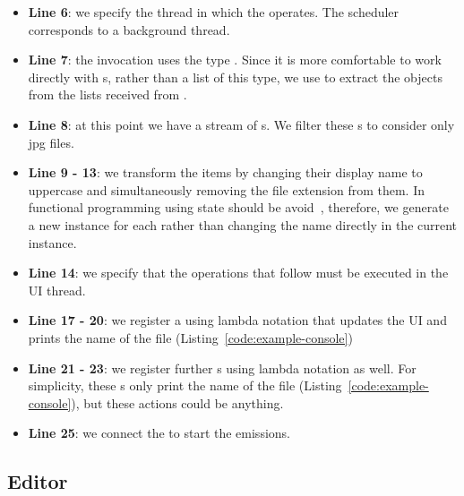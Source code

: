 \documentclass[type=bsc,accentcolor=tud9c]{tudthesis}
\begin{document}
\begin{itemize}
	\item {\bf Line 6}: we specify the thread in which the  operates. The scheduler  corresponds to a background thread.
	\item {\bf Line 7}: the  invocation uses the type . Since it is more comfortable to work directly with s, rather than a list of this type, we use  to extract the  objects from the lists received from .
	\item {\bf Line 8}: at this point we have a stream of s. We filter these s to consider only jpg files.
	\item {\bf Line 9 - 13}: we transform the items by changing their display name to uppercase and simultaneously removing the file extension from them. In functional programming using state should be avoid~\cite{bookFunctionalProgramming}, therefore, we generate a new instance for each  rather than changing the name directly in the current instance. 
	\item {\bf Line 14}: we specify that the operations that follow must be executed in the UI thread.
	\item {\bf Line 17 - 20}: we register a  using lambda notation that updates the UI and prints the name of the file (Listing~\ref{code:example-console})
	\item {\bf Line 21 - 23}: we register further s using lambda notation as well. For simplicity, these s only print the name of the file  (Listing~\ref{code:example-console}), but these actions could be anything.
	\item {\bf Line 25}: we connect the  to start the emissions.
\end{itemize}



\subsection{Editor}
\end{document}
